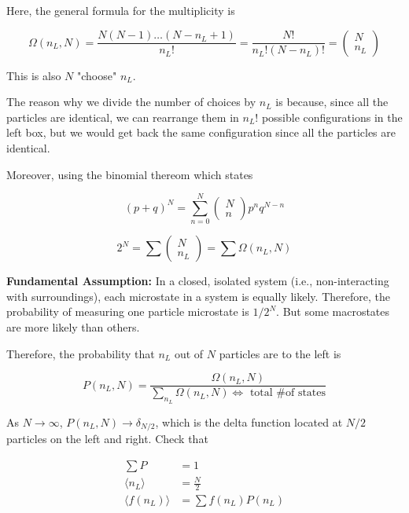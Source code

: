 \documentclass{article}
\newtheorem{one minute paper}[theorem]{One Minute Paper}
\begin{document}
Here, the general formula for the multiplicity is 

\begin{equation}
    \Omega(n_L, N) = \frac{N(N-1)\dots(N - n_L +1)}{n_L!} = \frac{N!}{n_L!(N - n_L)!} = \begin{pmatrix}
        N \\
        n_L
    \end{pmatrix}
\end{equation}

This is also $N$ "choose" $n_L$. 

The reason why we divide the number of choices by $n_L$ is because, since all the particles are identical, we can rearrange them in $n_L!$ possible configurations in the left box, but we would get back the same configuration since all the particles are identical. 

Moreover, using the binomial thereom which states 

\begin{equation}
    (p + q)^N = \sum^N_{n=0}\begin{pmatrix}
        N \\
        n
    \end{pmatrix}p^{n}q^{N-n}
\end{equation}

\begin{equation}
    2^N = \sum \begin{pmatrix}
        N\\
        n_L
    \end{pmatrix} = \sum \Omega(n_L, N)
\end{equation}

\textbf{Fundamental Assumption:} In a closed, isolated system (i.e., non-interacting with surroundings), each microstate in a system is equally likely. Therefore, the probability of measuring one particle microstate is $1/2^N$. But some macrostates are more likely than others. 

Therefore, the probability that $n_L$ out of $N$ particles are to the left is 

\begin{equation}
    P(n_L, N) = \frac{\Omega(n_L, N)}{\sum_{n_L}\Omega(n_L, N) \iff \text{ total \# of states}}
\end{equation}

As $N \rightarrow \infty$, $P(n_L, N) \rightarrow \delta_{N/2}$, which is the delta function located at $N/2$ particles on the left and right. Check that 

\begin{align}
    \sum P &= 1\\
    \langle n_L \rangle &= \frac{N}{2} \\
    \langle f(n_L) \rangle &= \sum f(n_L)P(n_L)
\end{align}
\end{document}
